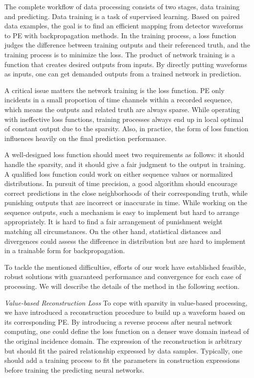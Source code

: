 The complete workflow of data processing consists of two stages, data training and predicting. Data training is a task of supervised learning.  Based on paired data examples, the goal is to find an efficient mapping from detector waveforms to PE with backpropagation methods. In the training process, a loss function judges the difference between training outputs and their referenced truth, and the training process is to minimize the loss. The product of network training is a function that creates desired outputs from inputs. By directly putting waveforms as inputs, one can get demanded outputs from a trained network in prediction.


A critical issue matters the network training is the loss function. PE only incidents in a small proportion of time channels within a recorded sequence, which means the outputs and related truth are always sparse. While operating with ineffective loss functions, training processes always end up in local optimal of constant output due to the sparsity. Also, in practice, the form of loss function influences heavily on the final prediction performance. 

A well-designed loss function should meet two requirements as follows: it should handle the sparsity, and it should give a fair judgment to the output in training. A qualified loss function could work on either sequence values or normalized distributions. In pursuit of time precision, a good algorithm should encourage correct predictions in the close neighborhoods of their corresponding truth, while punishing outputs that are incorrect or inaccurate in time. While working on the sequence outputs, such a mechanism is easy to implement but hard to arrange appropriately. It is hard to find a fair arrangement of punishment weight matching all circumstances. On the other hand, statistical distances and divergences could assess the difference in distribution but are hard to implement in a trainable form for backpropagation. 

To tackle the mentioned difficulties, efforts of our work have established feasible, robust solutions with guaranteed performance and convergence for each case of processing. We will describe the details of the method in the following section.

\emph{Value-based Reconstruction Loss}
To cope with sparsity in value-based processing, we have introduced a reconstruction procedure to build up a waveform based on its corresponding PE. By introducing a reverse process after neural network computing, one could define the loss function on a denser wave domain instead of the original incidence domain. The expression of the reconstruction is arbitrary but should fit the paired relationship expressed by data samples. Typically, one should add a training process to fit the parameters in construction expressions before training the predicting neural networks.

